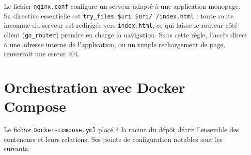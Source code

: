 Le fichier \texttt{nginx.conf} configure un serveur adapté à une application
monopage. Sa directive essentielle est
\texttt{try\_files \$uri \$uri/ /index.html} : toute route inconnue du
serveur est redirigée vers \texttt{index.html}, ce qui laisse le routeur
côté client (\texttt{go\_router}) prendre en charge la navigation. Sans
cette règle, l'accès direct à une adresse interne de l'application, ou un
simple rechargement de page, renverrait une erreur 404.

\section*{Orchestration avec Docker Compose}

Le fichier \texttt{Docker-compose.yml} placé à la racine du dépôt décrit
l'ensemble des conteneurs et leurs relations. Ses points de configuration
notables sont les suivants.

